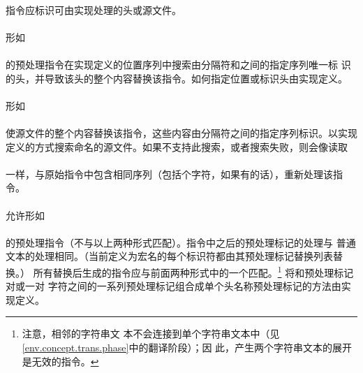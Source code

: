 {

\constraint
\paragraph{}
指令应标识可由实现处理的头或源文件。

\semantic
\paragraph{}
形如                                                                          \\
\mbox{\hspace{4em}\tm{>} }  \\
的预处理指令在实现定义的位置序列中搜索由分隔符\tm{<}和\tm{>}之间的指定序列唯一标
识的头，并导致该头的整个内容替换该指令。如何指定位置或标识头由实现定义。

\paragraph{}
形如                                                                          \\
\mbox{\hspace{4em}\tm{\dq}
  }                                                              \\
使源文件的整个内容替换该指令，这些内容由分隔符\tm{\dq}之间的指定序列标识。以实现
定义的方式搜索命名的源文件。如果不支持此搜索，或者搜索失败，则会像读取        \\
\mbox{\hspace{4em}\tm{>} }  \\
一样，与原始指令中包含相同序列（包括\tm{>}个字符，如果有的话），重新处理该指令。

\paragraph{}
允许形如                                                                      \\
\mbox{\hspace{4em} }                    \\
的预处理指令（不与以上两种形式匹配）。指令中之后的预处理标记的处理与
普通文本的处理相同。（当前定义为宏名的每个标识符都由其预处理标记替换列表替换。）
所有替换后生成的指令应与前面两种形式中的一个匹配。\footnote{注意，相邻的字符串文
本不会连接到单个字符串文本中（见\ref{env.concept.trans.phase}中的翻译阶段）；因
此，产生两个字符串文本的展开是无效的指令。} 将\tm{<}和\tm{>}预处理标记对或一对
\tm{\dq}字符之间的一系列预处理标记组合成单个头名称预处理标记的方法由实现定义。

}
